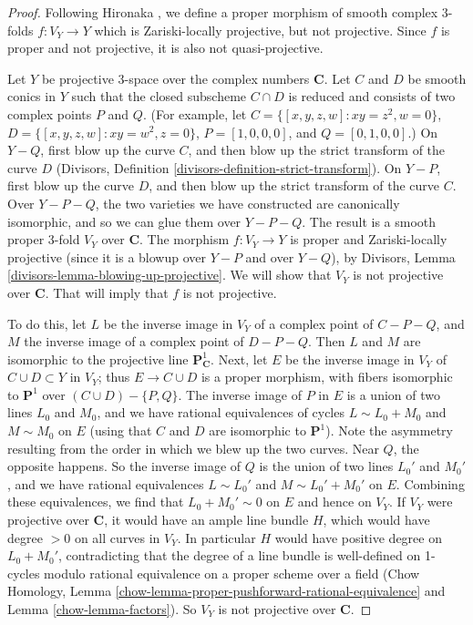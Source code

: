 \documentclass[10pt,a4paper]{amsart}
\theoremstyle{plain}
\theoremstyle{definition}
\theoremstyle{remark}
\numberwithin{equation}{subsection}
\begin{document}
\begin{proof}
Following Hironaka \cite[Example B.3.4.1]{H},
we define a proper morphism of smooth complex 3-folds
$f:V_Y\to Y$
which is Zariski-locally projective, but not projective. Since $f$ is proper
and not projective, it is also not quasi-projective.

\medskip\noindent
Let $Y$ be projective 3-space over the complex numbers ${\mathbf C}$.
Let $C$ and $D$ be smooth conics in $Y$ such
that the closed subscheme $C\cap D$ is reduced and consists
of two complex points $P$ and $Q$. (For example,
let $C=\{ [x,y,z,w]: xy=z^2, w=0\}$, $D=\{ [x,y,z,w]:
xy=w^2, z=0\}$, $P=[1,0,0,0]$,
and $Q=[0,1,0,0]$.) 
On $Y-Q$, first blow up the curve $C$, and then blow
up the strict transform of the curve $D$ (Divisors, Definition 
\ref{divisors-definition-strict-transform}). On $Y-P$, first blow up
the curve $D$, and then blow up the strict transform of the curve
$C$. Over $Y-P-Q$, the two varieties we have constructed are canonically
isomorphic, and so we can glue them over $Y-P-Q$. The result
is a smooth proper 3-fold $V_Y$ over ${\mathbf C}$. The morphism
$f:V_Y\to Y$ is proper and Zariski-locally projective (since
it is a blowup over $Y-P$ and over $Y-Q$), by Divisors,
Lemma \ref{divisors-lemma-blowing-up-projective}. We will show that
$V_Y$ is not projective over ${\mathbf C}$. That will imply that
$f$ is not projective.

\medskip\noindent
To do this, let $L$ be the inverse image in $V_Y$ of a complex point
of $C-P-Q$, and $M$ the inverse image of a complex point of $D-P-Q$.
Then $L$ and $M$ are isomorphic to the projective line
${\mathbf P}^1_{{\mathbf C}}$. 
Next, let $E$ be the inverse image in $V_Y$ of $C\cup D\subset Y$ in $V_Y$;
thus $E\rightarrow C\cup D$ is a proper morphism, with fibers
isomorphic to ${\mathbf P}^1$ over $(C\cup D)-\{P,Q\}$.
The inverse
image of $P$ in $E$ is a union of two lines $L_0$ and $M_0$, and we have
rational equivalences of cycles $L\sim L_0+M_0$ and $M\sim M_0$ on $E$
(using that $C$ and $D$ are isomorphic to ${\mathbf P}^1$).
Note the asymmetry resulting from the order in which we blew
up the two curves. Near $Q$, the opposite happens. So the inverse image
of $Q$ is the union of two lines $L_0'$ and $M_0'$, and we have
rational equivalences $L\sim L_0'$ and $M\sim L_0'+M_0'$ on $E$.
Combining these equivalences, we find that $L_0+M_0'\sim 0$
on $E$ and hence on $V_Y$. If $V_Y$ were projective over ${\mathbf C}$,
it would have
an ample line bundle $H$, which would have degree $> 0$ on all curves
in $V_Y$. In particular $H$ would have positive degree on $L_0+M_0'$,
contradicting that the degree of a line bundle is well-defined
on 1-cycles modulo rational equivalence on a proper scheme
over a field (Chow Homology,
Lemma \ref{chow-lemma-proper-pushforward-rational-equivalence}
and Lemma \ref{chow-lemma-factors}).
So $V_Y$ is not projective over ${\mathbf C}$.
\end{proof}



\end{document}
